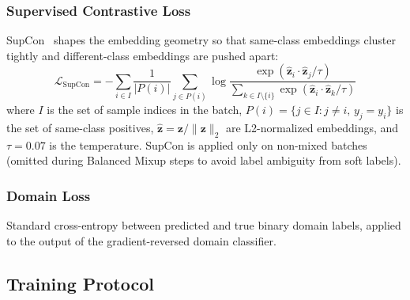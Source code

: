 \documentclass[10pt,journal,compsoc]{IEEEtran}
\begin{document}
\subsubsection{Supervised Contrastive Loss}
SupCon~\cite{supcon} shapes the embedding geometry so that same-class
embeddings cluster tightly and different-class embeddings are pushed apart:
\begin{equation}
\mathcal{L}_\mathrm{SupCon} = -\sum_{i \in I}
  \frac{1}{|P(i)|}
  \sum_{j \in P(i)}
  \log \frac{\exp(\hat{\mathbf{z}}_i \cdot \hat{\mathbf{z}}_j / \tau)}
  {\displaystyle\sum_{k \in I \setminus \{i\}}
   \exp(\hat{\mathbf{z}}_i \cdot \hat{\mathbf{z}}_k / \tau)}
\label{eq:supcon}
\end{equation}
where $I$ is the set of sample indices in the batch,
$P(i) = \{j \in I : j \neq i,\, y_j = y_i\}$ is the set of
same-class positives, $\hat{\mathbf{z}} = \mathbf{z}/\|\mathbf{z}\|_2$
are L2-normalized embeddings, and $\tau = 0.07$ is the temperature.
SupCon is applied only on non-mixed batches (omitted during Balanced
Mixup steps to avoid label ambiguity from soft labels).

\subsubsection{Domain Loss}
Standard cross-entropy between predicted and true binary domain labels,
applied to the output of the gradient-reversed domain classifier.

\subsection{Training Protocol}
\label{sec:training_protocol}
\end{document}
